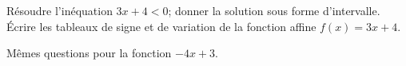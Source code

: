 
\begin{exercice}\label{exosmath-0148}

    Résoudre l'inéquation \( 3x+4<0\); donner la solution sous forme d'intervalle. Écrire les tableaux de signe et de variation de la fonction affine \( f(x)=3x+4\).

    Mêmes questions pour la fonction \( -4x+3\).

\end{exercice}
